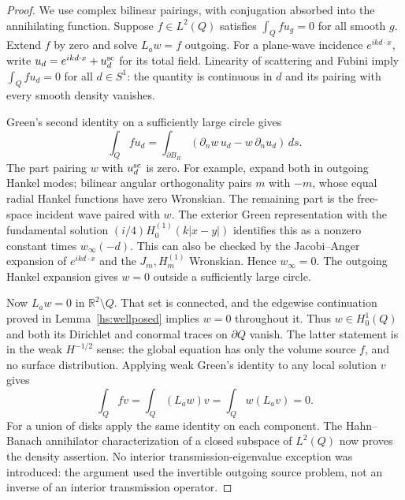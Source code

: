 \begin{proof}
We use complex bilinear pairings, with conjugation absorbed into the
annihilating function.  Suppose $f\in L^2(Q)$ satisfies
$\int_Q f u_g=0$ for all smooth $g$.  Extend $f$ by zero and solve
$L_aw=f$ outgoing.  For a plane-wave incidence $e^{ikd\cdot x}$,
write $u_d=e^{ikd\cdot x}+u_d^{\rm sc}$ for its total field.
Linearity of scattering and Fubini imply
$\int_Qf u_d=0$ for all $d\in S^1$: the quantity is continuous in
$d$ and its pairing with every smooth density vanishes.

Green's second identity on a sufficiently large circle gives
\begin{equation}
 \int_Q f u_d
 =\int_{\partial B_R}
       (\partial_nw\,u_d-w\,\partial_nu_d)\,ds.
 \label{hs:reciprocity-boundary}
\end{equation}
The part pairing $w$ with $u_d^{\rm sc}$ is zero.  For example, expand
both in outgoing Hankel modes; bilinear angular orthogonality pairs
$m$ with $-m$, whose equal radial Hankel functions have zero
Wronskian.  The remaining part is the free-space incident wave paired
with $w$.  The exterior Green representation with the fundamental
solution $(i/4)H_0^{(1)}(k|x-y|)$ identifies this as a nonzero constant
times $w_\infty(-d)$.  This can also be checked by the
Jacobi--Anger expansion of $e^{ikd\cdot x}$ and the $J_m,H_m^{(1)}$
Wronskian.  Hence $w_\infty=0$.  The outgoing Hankel expansion gives
$w=0$ outside a sufficiently large circle.

Now $L_aw=0$ in $\mathbb R^2\setminus Q$.  That set is connected,
and the edgewise continuation proved in Lemma~\ref{hs:wellposed}
implies $w=0$ throughout it.  Thus $w\in H_0^1(Q)$ and both its
Dirichlet and conormal traces on $\partial Q$ vanish.  The latter
statement is in the weak $H^{-1/2}$ sense: the global equation has
only the volume source $f$, and no surface distribution.  Applying
weak Green's identity to any local solution $v$ gives
\begin{equation}
 \int_Qfv
 =\int_Q(L_aw)v
 =\int_Qw(L_av)=0.
 \label{hs:annihilator}
\end{equation}
For a union of disks apply the same identity on each component.
The Hahn--Banach annihilator characterization of a closed subspace
of $L^2(Q)$ now proves the density assertion.  No interior
transmission-eigenvalue exception was introduced: the argument used
the invertible outgoing source problem, not an inverse of an
interior transmission operator.
\end{proof}

